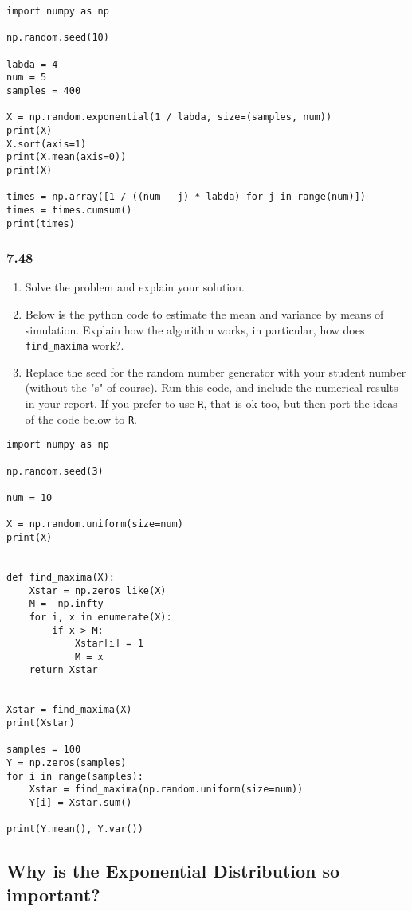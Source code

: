 \documentclass[a4paper]{article}
\theoremstyle{definition}
\newcommand{\1}[1]{\,I_{#1}} %
\begin{document}
\begin{verbatim}
import numpy as np

np.random.seed(10)

labda = 4
num = 5
samples = 400

X = np.random.exponential(1 / labda, size=(samples, num))
print(X)
X.sort(axis=1)
print(X.mean(axis=0))
print(X)

times = np.array([1 / ((num - j) * labda) for j in range(num)])
times = times.cumsum()
print(times)
\end{verbatim}




\subsubsection{7.48}
\label{sec:org56d10c5}
\begin{enumerate}
\item Solve  the problem and explain your solution.
\item Below is the python code to estimate the mean and variance by means of simulation.   Explain how the algorithm works, in particular, how does \texttt{find\_maxima} work?.
\item Replace the seed for the random number generator with your student number (without the "s" of course). Run this code, and include the numerical results in your report. If you prefer to use \texttt{R}, that is ok too, but then port the ideas of the code below to \texttt{R}.
\end{enumerate}

\begin{verbatim}
import numpy as np

np.random.seed(3)

num = 10

X = np.random.uniform(size=num)
print(X)


def find_maxima(X):
    Xstar = np.zeros_like(X)
    M = -np.infty
    for i, x in enumerate(X):
        if x > M:
            Xstar[i] = 1
            M = x
    return Xstar


Xstar = find_maxima(X)
print(Xstar)

samples = 100
Y = np.zeros(samples)
for i in range(samples):
    Xstar = find_maxima(np.random.uniform(size=num))
    Y[i] = Xstar.sum()

print(Y.mean(), Y.var())
\end{verbatim}


\subsection{Why is the Exponential Distribution so important?}
\label{sec:org50b29b7}
\end{document}
